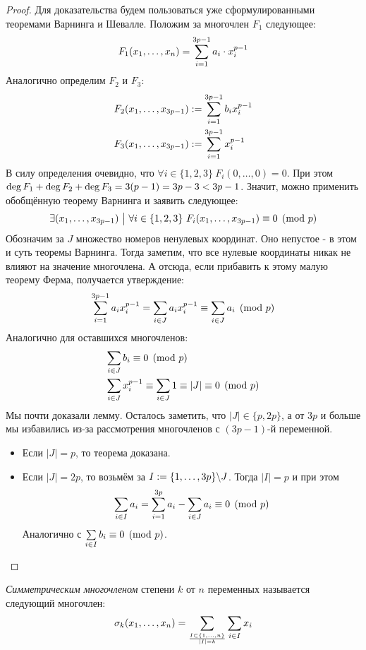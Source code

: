 \begin{proof}
	Для доказательства будем пользоваться уже сформулированными теоремами Варнинга и Шевалле. Положим за многочлен $F_1$ следующее:
	\[
		F_1(x_1, \ldots, x_n) = \sum\limits_{i = 1}^{3p - 1} a_i \cdot x_i^{p - 1}
	\]
	Аналогично определим $F_2$ и $F_3$:
	\begin{align*}
		&{F_2(x_1, \ldots, x_{3p - 1}) := \sum\limits_{i = 1}^{3p - 1} b_i x_i^{p - 1}}
		\\
		&{F_3(x_1, \ldots, x_{3p - 1}) := \sum\limits_{i = 1}^{3p - 1} x_i^{p - 1}}
	\end{align*}
	В силу определения очевидно, что $\forall i \in \{1, 2, 3\}\ F_i(0, \ldots, 0) = 0$. При этом $\operatorname{deg} F_1 + \operatorname{deg} F_2 + \operatorname{deg} F_3 = 3(p - 1) = 3p - 3 < 3p - 1$. Значит, можно применить обобщённую теорему Варнинга и заявить следующее:
	\[
		\exists (x_1, \ldots, x_{3p - 1}) \ \big|\  \forall i \in \{1, 2, 3\}\ F_i(x_1, \ldots, x_{3p - 1}) \equiv 0 \pmod p
	\]
	Обозначим за $J$ множество номеров ненулевых координат. Оно непустое - в этом и суть теоремы Варнинга. Тогда заметим, что все нулевые координаты никак не влияют на значение многочлена. А отсюда, если прибавить к этому малую теорему Ферма, получается утверждение:
	\[
		\sum\limits_{i = 1}^{3p - 1} a_i x_i^{p - 1} = \sum\limits_{i \in J} a_i x_i^{p - 1} \equiv \sum\limits_{i \in J} a_i \pmod p
	\]
	Аналогично для оставшихся многочленов:
	\begin{align*}
		&{\sum\limits_{i \in J} b_i \equiv 0 \pmod p}
		\\
		&{\sum\limits_{i \in J} x_i^{p - 1} \equiv \sum\limits_{i \in J} 1 \equiv |J| \equiv 0 \pmod p}
	\end{align*}
	Мы почти доказали лемму. Осталось заметить, что $|J| \in \{p, 2p\}$, а от $3p$ и больше мы избавились из-за рассмотрения многочленов с $(3p - 1)$-й переменной.
	\begin{itemize}
		\item Если $|J| = p$, то теорема доказана.
		
		\item Если $|J| = 2p$, то возьмём за $I := \{1, \ldots, 3p\} \backslash J$. Тогда $|I| = p$ и при этом
		\[
			\sum\limits_{i \in I} a_i = \sum\limits_{i = 1}^{3p} a_i - \sum\limits_{i \in J} a_i \equiv 0 \pmod p
		\]
		Аналогично с $\sum\limits_{i \in I} b_i \equiv 0 \pmod p$.
	\end{itemize}
\end{proof}

\begin{definition}
	\textit{Симметрическим многочленом} степени $k$ от $n$ переменных называется следующий многочлен:
	\[
		\sigma_k(x_1, \ldots, x_n) = \sum\limits_{I \subset \{1, \ldots, n\} \over |I| = k} \sum\limits_{i \in I} x_i
	\]
\end{definition}

